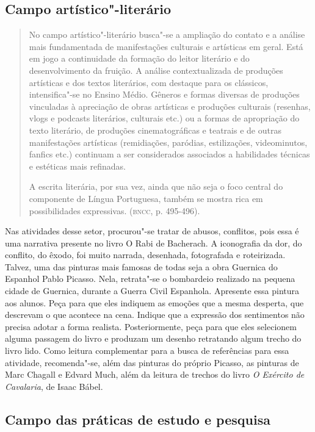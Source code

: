 \documentclass[12pt]{extarticle}
\begin{document}
\subsection{Campo artístico"-literário}

\begin{quote}
No campo artístico"-literário busca"-se a ampliação do contato e a
análise mais fundamentada de manifestações culturais e artísticas em
geral. Está em jogo a continuidade da formação do leitor literário e do
desenvolvimento da fruição. A análise contextualizada de produções
artísticas e dos textos literários, com destaque para os clássicos,
intensifica"-se no Ensino Médio. Gêneros e formas diversas de produções
vinculadas à apreciação de obras artísticas e produções culturais
(resenhas, vlogs e podcasts literários, culturais etc.) ou a formas de
apropriação do texto literário, de produções cinematográficas e teatrais
e de outras manifestações artísticas (remidiações, paródias,
estilizações, videominutos, fanfics etc.) continuam a ser considerados
associados a habilidades técnicas e estéticas mais refinadas.

A escrita literária, por sua vez, ainda que não seja o foco central do
componente de Língua Portuguesa, também se mostra rica em possibilidades
expressivas. (\textsc{bncc}, p. 495-496).
\end{quote}

Nas atividades desse setor, procurou"-se tratar de abusos, conflitos,
pois essa é uma narrativa presente no livro O Rabi de Bacherach. A
iconografia da dor, do conflito, do êxodo, foi muito narrada,
desenhada, fotografada e roteirizada. Talvez, uma das pinturas mais
famosas de todas seja a obra Guernica do Espanhol Pablo Picasso. Nela,
retrata"-se o bombardeio realizado na pequena cidade de Guernica,
durante a Guerra Civil Espanhola. Apresente essa pintura aos alunos.
Peça para que eles indiquem as emoções que a mesma desperta, que
descrevam o que acontece na cena. Indique que a expressão dos
sentimentos não precisa adotar a forma realista. Posteriormente, peça
para que eles selecionem alguma passagem do livro e produzam um
desenho retratando algum trecho do livro lido. Como leitura
complementar para a busca de referências para essa atividade,
recomenda"-se, além das pinturas do próprio Picasso, as pinturas de Marc
Chagall e Edvard Much, além da leitura de trechos do livro \emph{O
Exército de Cavalaria}, de Isaac Bábel.

\subsection{Campo das práticas de estudo e pesquisa}
\end{document}
